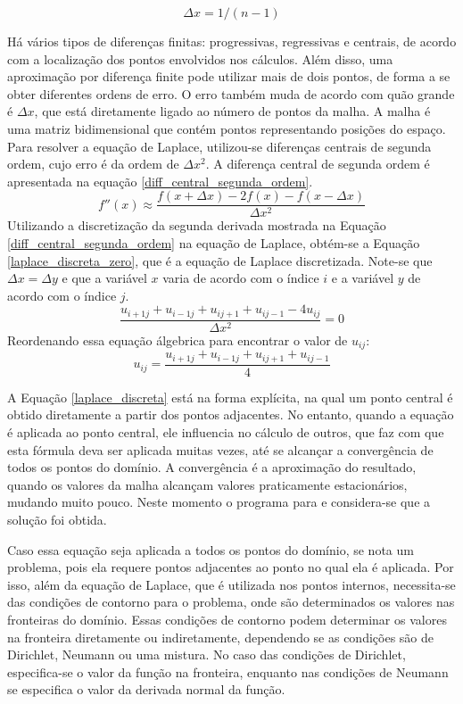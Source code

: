 \documentclass[journal]{IEEEtran}
\begin{document}
\begin{equation}
\Delta x = 1/(n-1)\label{delta_x}
\end{equation}


Há vários tipos de diferenças finitas: progressivas, regressivas e centrais, de acordo com a localização dos pontos envolvidos nos cálculos. Além disso, uma aproximação por diferença finite pode utilizar mais de dois pontos, de forma a se obter diferentes ordens de erro. O erro também muda de acordo com quão grande é $\Delta x$, que está diretamente ligado ao número de pontos da malha. A malha é uma matriz bidimensional que contém pontos representando posições do espaço. Para resolver a equação de Laplace, utilizou-se diferenças centrais de segunda ordem, cujo erro é da ordem de $\Delta x^2$. A diferença central de segunda ordem é apresentada na equação \ref{diff_central_segunda_ordem}.
\begin{equation}
f''(x)\approx \frac{f(x+\Delta x)-2f(x)-f(x-\Delta x)}{\Delta x^2}\label{diff_central_segunda_ordem}
\end{equation}
Utilizando a discretização da segunda derivada mostrada na Equação \ref{diff_central_segunda_ordem} na equação de Laplace, obtém-se a Equação \ref{laplace_discreta_zero}, que é a equação de Laplace discretizada. Note-se que $\Delta x=\Delta y$ e que a variável $x$ varia de acordo com o índice $i$ e a variável $y$ de acordo com o índice $j$.
\begin{equation}
\frac{u_{i+1j}+u_{i-1j}+u_{ij+1}+u_{ij-1}-4u_{ij}}{\Delta x^2}=0 \label{laplace_discreta_zero}
\end{equation}
Reordenando essa equação álgebrica para encontrar o valor de $u_{ij}$:
\begin{equation}
  u_{ij}=\frac{u_{i+1j}+u_{i-1j}+u_{ij+1}+u_{ij-1}}{4} \label{laplace_discreta}
\end{equation}

A Equação \ref{laplace_discreta} está na forma explícita, na qual um ponto central é obtido diretamente a partir dos pontos adjacentes. No entanto, quando a equação é aplicada ao ponto central, ele influencia no cálculo de outros, que faz com que esta fórmula deva ser aplicada muitas vezes, até se alcançar a convergência de todos os pontos do domínio. A convergência é a aproximação do resultado, quando os valores da malha alcançam valores praticamente estacionários, mudando muito pouco. Neste momento o programa para e considera-se que a solução foi obtida.

Caso essa equação seja aplicada a todos os pontos do domínio, se nota um problema, pois ela requere pontos adjacentes ao ponto no qual ela é aplicada. Por isso, além da equação de Laplace, que é utilizada nos pontos internos, necessita-se das condições de contorno para o problema, onde são determinados os valores nas fronteiras do domínio. Essas condições de contorno podem determinar os valores na fronteira diretamente ou indiretamente, dependendo se as condições são de Dirichlet, Neumann ou uma mistura. No caso das condições de Dirichlet, especifica-se o valor da função na fronteira, enquanto nas condições de Neumann se especifica o valor da derivada normal da função.
\end{document}
